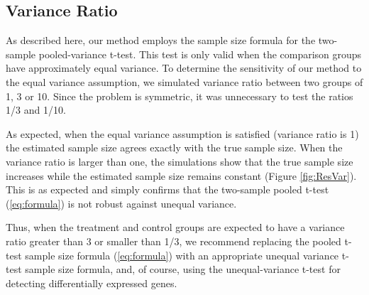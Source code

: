 \documentclass[12pt]{article}
\begin{document}
\subsection{Variance Ratio}

As described here, our method employs the sample size formula for
the two-sample pooled-variance t-test.  This test
is only valid when the comparison groups have approximately equal
variance. To determine the sensitivity of our method to the equal
variance assumption, we simulated variance ratio between two groups
of 1, 3 or 10.  Since the problem is symmetric, it was unnecessary
to test the ratios 1/3 and 1/10.

As expected, when the equal variance assumption is satisfied
(variance ratio is 1) the estimated sample size agrees exactly
with the true sample size. When the variance ratio is larger than
one, the simulations show that the true sample size increases
while the estimated sample size remains constant (Figure
\ref{fig:ResVar}).   This is as expected and simply confirms that
the two-sample pooled t-test (\ref{eq:formula}) is not robust
against unequal variance.

Thus, when the treatment and control groups are expected to have a
variance ratio greater than 3 or smaller than 1/3, we recommend
replacing the pooled t-test sample size formula (\ref{eq:formula})
with an appropriate unequal variance t-test sample size formula,
and, of course, using the unequal-variance t-test for detecting
differentially expressed genes.
\end{document}
